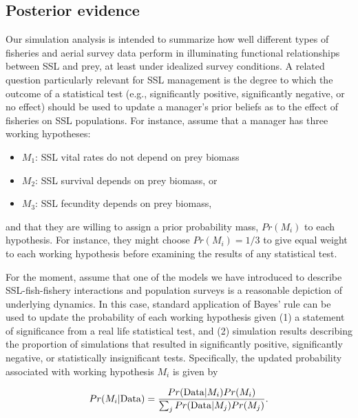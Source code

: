 \documentclass[11pt]{article}
\begin{document}
\subsection{Posterior evidence}

Our simulation analysis is intended to summarize how well different types of fisheries and aerial survey data perform in illuminating functional relationships between SSL and prey, at least under idealized survey conditions.  A related question particularly relevant for SSL management is the degree to which the outcome of a statistical test (e.g., significantly positive, significantly negative, or no effect) should be used to update a manager's prior beliefs as to the effect of fisheries on SSL populations.  For instance, assume that a manager has three working hypotheses:
\begin{itemize}
\item $M_1$: SSL vital rates do not depend on prey biomass
\item $M_2$: SSL survival depends on prey biomass, or
\item $M_3$: SSL fecundity depends on prey biomass,
\end{itemize}
and that they are willing to assign a prior probability mass, $Pr(M_i)$ to each hypothesis.  For instance,
they might choose $Pr(M_i)=1/3$ to give equal weight to each working hypothesis before examining the results of any statistical test.

For the moment, assume that one of the models we have introduced to describe SSL-fish-fishery interactions and population surveys is a reasonable depiction of underlying dynamics.  In this case, standard application of Bayes' rule can be used to update the probability of each working hypothesis given (1) a statement of significance from a real life statistical test, and (2) simulation results describing the proportion of simulations that resulted in significantly positive, significantly negative, or statistically insignificant tests.  Specifically, the updated probability associated with working hypothesis $M_i$ is given by
\begin{linenomath}
  \begin{equation*}
     \label{eq:Bayes}
     Pr(M_i | {\rm Data}) = \frac{Pr({\rm Data}|M_i)Pr(M_i)}{\sum_j Pr({\rm Data}|M_j)Pr(M_j)}.
  \end{equation*}
\end{linenomath}
\end{document}
